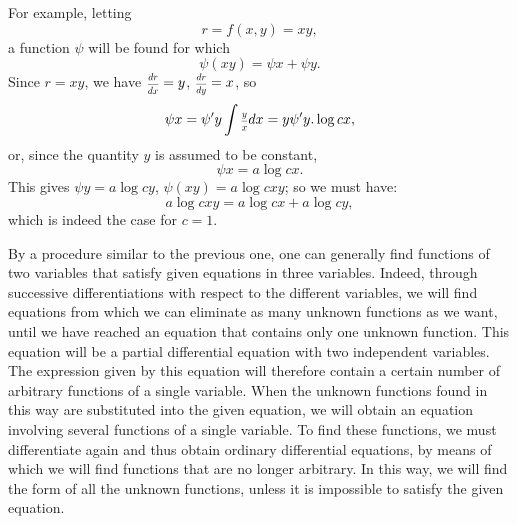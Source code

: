 \documentclass[oneside, 12 pt, leqno]{memoir}
\let\oldfrac\frac
\def\frac#1#2{\mathchoice{\text{\scalebox{.83}{${\oldfrac{#1}{#2}}$}}}{\text{\scalebox{.83}{${\displaystyle\oldfrac{#1}{#2}}$}}}{\genfrac{}{}{}{2}{#1}{#2}}{\genfrac{}{}{}{3}{#1}{#2}}}
\begin{document}
For example, letting
\[r=f(x, y)=x y,\]
a function \(\psi\) will be found for which
\[\psi(x y)=\psi x+\psi y.\]
Since \(r=x y\), we have \(\frac{d r}{d x}=y\), \(\frac{d r}{d y}=x\), so
\[\psi x=\psi^{\prime} y \int \frac{y}{x} d x=y \psi^{\prime} y. \log c x,\]
or, since the quantity \(y\) is assumed to be constant,
\[\psi x=a \log c x.\]
This gives \(\psi y=a \log c y\), \(\psi(x y)=a \log c x y\); so we must have:
\[a \log c x y=a \log c x+a \log c y,\]
which is indeed the case for \(c=1\).

By a procedure similar to the previous one, one can generally find functions of two variables that satisfy given equations in three variables. Indeed, through successive differentiations with respect to the different variables, we will find equations from which we can eliminate as many unknown functions as we want, until we have reached an equation that contains only one unknown function. This equation will be a partial differential equation with two independent variables. The expression given by this equation will therefore contain a certain number of arbitrary functions of a single variable. When the unknown functions found in this way are substituted into the given equation, we will obtain an equation involving several functions of a single variable. To find these functions, we must differentiate again and thus obtain ordinary differential equations, by means of which we will find functions that are no longer arbitrary. In this way, we will find the form of all the unknown functions, unless it is impossible to satisfy the given equation.
\end{document}
